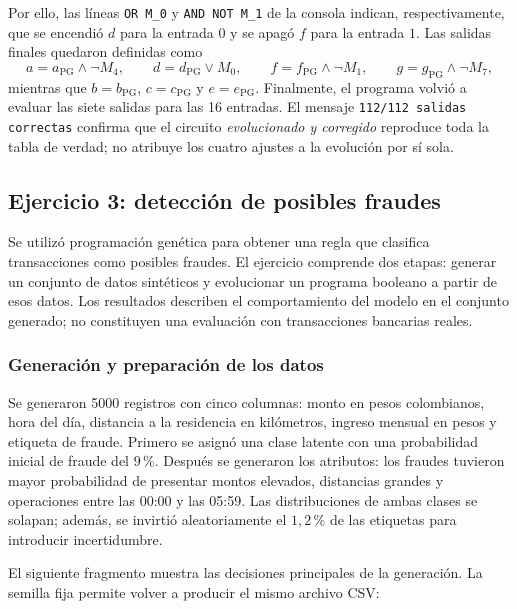 \documentclass[14pt,twoside]{article}
\begin{document}
Por ello, las líneas \texttt{OR M\_0} y \texttt{AND NOT M\_1} de la consola indican, respectivamente, que se encendió \(d\) para la entrada \(0\) y se apagó \(f\) para la entrada \(1\). Las salidas finales quedaron definidas como
\[
a=a_{\mathrm{PG}}\land\neg M_4,\qquad
d=d_{\mathrm{PG}}\lor M_0,\qquad
f=f_{\mathrm{PG}}\land\neg M_1,\qquad
g=g_{\mathrm{PG}}\land\neg M_7,
\]
mientras que \(b=b_{\mathrm{PG}}\), \(c=c_{\mathrm{PG}}\) y \(e=e_{\mathrm{PG}}\). Finalmente, el programa volvió a evaluar las siete salidas para las 16 entradas. El mensaje \texttt{112/112 salidas correctas} confirma que el circuito \emph{evolucionado y corregido} reproduce toda la tabla de verdad; no atribuye los cuatro ajustes a la evolución por sí sola.

\subsection{Ejercicio 3: detección de posibles fraudes}

Se utilizó programación genética para obtener una regla que clasifica transacciones como posibles fraudes. El ejercicio comprende dos etapas: generar un conjunto de datos sintéticos y evolucionar un programa booleano a partir de esos datos. Los resultados describen el comportamiento del modelo en el conjunto generado; no constituyen una evaluación con transacciones bancarias reales.

\subsubsection{Generación y preparación de los datos}

Se generaron 5000 registros con cinco columnas: monto en pesos colombianos, hora del día, distancia a la residencia en kilómetros, ingreso mensual en pesos y etiqueta de fraude. Primero se asignó una clase latente con una probabilidad inicial de fraude del \(9\,\%\). Después se generaron los atributos: los fraudes tuvieron mayor probabilidad de presentar montos elevados, distancias grandes y operaciones entre las 00:00 y las 05:59. Las distribuciones de ambas clases se solapan; además, se invirtió aleatoriamente el \(1{,}2\,\%\) de las etiquetas para introducir incertidumbre.

El siguiente fragmento muestra las decisiones principales de la generación. La semilla fija permite volver a producir el mismo archivo CSV:
\end{document}
